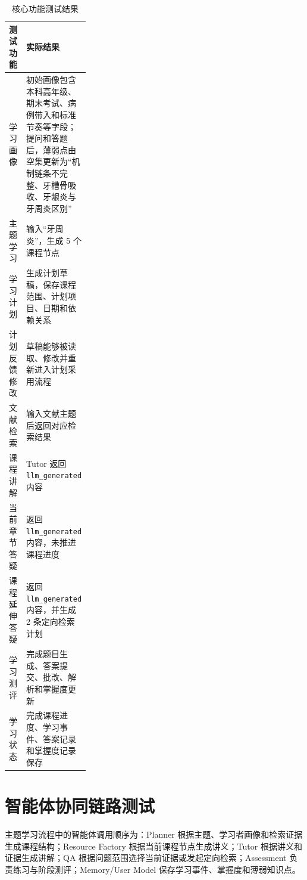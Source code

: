 \begin{table}[H]
  \centering
  \caption{核心功能测试结果}
  \label{tab:function-test}
  \begin{tabularx}{\linewidth}{p{0.27\linewidth}X}
    \toprule
    测试功能 & 实际结果 \\
    \midrule
    学习画像 & 初始画像包含本科高年级、期末考试、病例带入和标准节奏等字段；提问和答题后，薄弱点由空集更新为“机制链条不完整、牙槽骨吸收、牙龈炎与牙周炎区别” \\
    主题学习 & 输入“牙周炎”，生成 5 个课程节点 \\
    学习计划 & 生成计划草稿，保存课程范围、计划项目、日期和依赖关系 \\
    计划反馈修改 & 草稿能够被读取、修改并重新进入计划采用流程 \\
    文献检索 & 输入文献主题后返回对应检索结果 \\
    课程讲解 & Tutor 返回 \texttt{llm\_generated} 内容 \\
    当前章节答疑 & 返回 \texttt{llm\_generated} 内容，未推进课程进度 \\
    课程延伸答疑 & 返回 \texttt{llm\_generated} 内容，并生成 2 条定向检索计划 \\
    学习测评 & 完成题目生成、答案提交、批改、解析和掌握度更新 \\
    学习状态 & 完成课程进度、学习事件、答案记录和掌握度记录保存 \\
    \bottomrule
  \end{tabularx}
\end{table}

\section{智能体协同链路测试}

主题学习流程中的智能体调用顺序为：Planner 根据主题、学习者画像和检索证据生成课程结构；Resource Factory 根据当前课程节点生成讲义；Tutor 根据讲义和证据生成讲解；QA 根据问题范围选择当前证据或发起定向检索；Assessment 负责练习与阶段测评；Memory/User Model 保存学习事件、掌握度和薄弱知识点。

